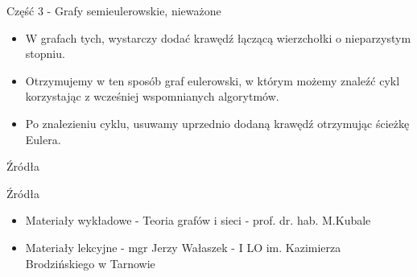 \documentclass[polish,envcountsect,10pt]{beamer}
\begin{document}
\begin{frame}{Część 3 - Grafy semieulerowskie, nieważone}
    \begin{block}{}
        \begin{itemize}
            \item W grafach tych, wystarczy dodać krawędź łączącą wierzchołki o nieparzystym stopniu.
            \item Otrzymujemy w ten sposób graf eulerowski, w którym możemy znaleźć cykl korzystając z wcześniej wspomnianych algorytmów.
            \item Po znalezieniu cyklu, usuwamy uprzednio dodaną krawędź otrzymując ścieżkę Eulera.
        \end{itemize}
    \end{block}
\end{frame}

\begin{frame}{Źródła}
    \begin{block}{Źródła}
        \begin{itemize}
            \item Materiały wykładowe - Teoria grafów i sieci - prof. dr. hab. M.Kubale
            \item Materiały lekcyjne - mgr Jerzy Wałaszek - I LO im. Kazimierza Brodzińskiego w Tarnowie
        \end{itemize}
    \end{block}
\end{frame}
\end{document}
